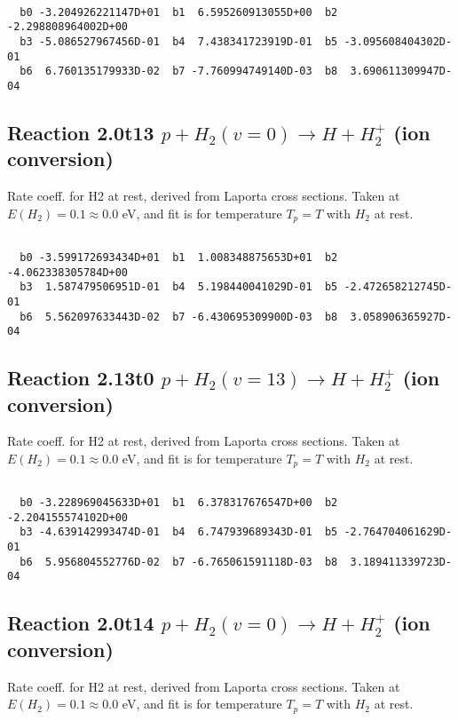 \begin{small}\begin{verbatim}

  b0 -3.204926221147D+01  b1  6.595260913055D+00  b2 -2.298808964002D+00
  b3 -5.086527967456D-01  b4  7.438341723919D-01  b5 -3.095608404302D-01
  b6  6.760135179933D-02  b7 -7.760994749140D-03  b8  3.690611309947D-04

\end{verbatim}\end{small}

\newpage
\subsection{
Reaction 2.0t13
$ p + H_2(v=0) \rightarrow H + H_2^+$ (ion conversion)
}
Rate coeff. for H2 at rest, derived from Laporta cross sections.
Taken at $E(H_2) = 0.1 \approx 0.0$ eV,  and fit is for temperature $T_p=T$ with $H_2$ at rest.

\begin{small}\begin{verbatim}

  b0 -3.599172693434D+01  b1  1.008348875653D+01  b2 -4.062338305784D+00
  b3  1.587479506951D-01  b4  5.198440041029D-01  b5 -2.472658212745D-01
  b6  5.562097633443D-02  b7 -6.430695309900D-03  b8  3.058906365927D-04

\end{verbatim}\end{small}

\newpage
\subsection{
Reaction 2.13t0
$ p + H_2(v=13) \rightarrow H + H_2^+$ (ion conversion)
}
Rate coeff. for H2 at rest, derived from Laporta cross sections.
Taken at $E(H_2) = 0.1 \approx 0.0$ eV,  and fit is for temperature $T_p=T$ with $H_2$ at rest.

\begin{small}\begin{verbatim}

  b0 -3.228969045633D+01  b1  6.378317676547D+00  b2 -2.204155574102D+00
  b3 -4.639142993474D-01  b4  6.747939689343D-01  b5 -2.764704061629D-01
  b6  5.956804552776D-02  b7 -6.765061591118D-03  b8  3.189411339723D-04

\end{verbatim}\end{small}

\newpage
\subsection{
Reaction 2.0t14
$ p + H_2(v=0) \rightarrow H + H_2^+$ (ion conversion)
}
Rate coeff. for H2 at rest, derived from Laporta cross sections.
Taken at $E(H_2) = 0.1 \approx 0.0$ eV,  and fit is for temperature $T_p=T$ with $H_2$ at rest.

